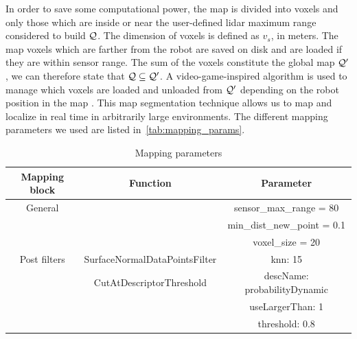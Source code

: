 In order to save some computational power, the map is divided into voxels and only those which are inside or near the user-defined lidar maximum range considered to build $\mathcal{Q}$.
The dimension of voxels is defined as $v_s$, in meters. %
The map voxels which are farther from the robot are saved on disk and are loaded if they are within sensor range.
The sum of the voxels constitute the global map $\mathcal{Q}'$, we can therefore state that $\mathcal{Q} \subseteq \mathcal{Q}'$. %
A video-game-inspired algorithm is used to manage which voxels are loaded and unloaded from $\mathcal{Q}'$ depending on the robot position in the map \transform{\robotf}{\mapf}. %
This map segmentation technique allows us to map and localize in real time in arbitrarily large environments.
The different mapping parameters we used are listed in~\autoref{tab:mapping_params}.


\begin{table}[htpb]
	\caption{Mapping parameters}
	\begin{center}
		\begin{tabular}{c c c} \toprule
			Mapping block & Function                      & Parameter                    \\
			\midrule
			General       &                               & sensor\_max\_range = 80      \\
			              &                               & min\_dist\_new\_point = 0.1  \\
			              &                               & voxel\_size = 20             \\
			\midrule
			Post filters  & SurfaceNormalDataPointsFilter & knn: 15                      \\
			              & CutAtDescriptorThreshold      & descName: probabilityDynamic \\
			              &                               & useLargerThan: 1             \\
			              &                               & threshold: 0.8               \\
			\bottomrule
		\end{tabular}
	\end{center}
	\label{tab:mapping_params}
\end{table}

